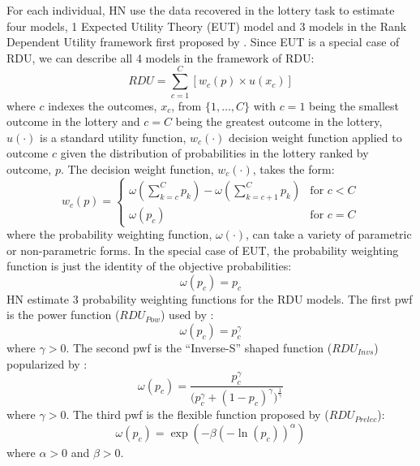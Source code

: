 \documentclass[../main.tex]{subfiles}
\begin{document}
For each individual, HN use the data recovered in the lottery task to estimate four models, 1 Expected Utility Theory (EUT) model and 3 models in the Rank Dependent Utility framework first proposed by \textcite{Quiggin1982}.
Since EUT is a special case of RDU, we can describe all 4 models in the framework of RDU:
\begin{equation}
	\label{eq4:RDU}
	RDU = \sum_{c=1}^{C} \left[ w_c(p) \times u(x_c) \right]
\end{equation}
\noindent where $c$ indexes the outcomes, $x_c$, from $\{1,\ldots,C\}$ with $c=1$ being the smallest outcome in the lottery and $c=C$ being the greatest outcome in the lottery, $u(\cdot)$ is a standard utility function, $w_c(\cdot)$ decision weight function applied to outcome $c$ given the distribution of probabilities in the lottery ranked by outcome, $p$.
The decision weight function, $w_c(\cdot)$, takes the form:
\begin{equation}
	\label{eq4:dweight}
	w_c(p) =
	\begin{cases}
		\omega\left(\displaystyle\sum_{k=c}^C p_k\right) - \omega\left(\displaystyle\sum_{k=c+1}^C p_k\right) & \text{for } c<C \\
		\omega(p_c) & \text{for } c = C
	\end{cases}
\end{equation}
\noindent where the probability weighting function, $\omega(\cdot)$, can take a variety of parametric or non-parametric forms.
In the special case of EUT, the probability weighting function is just the identity of the objective probabilities:
\begin{equation}
	\label{eq4:pw:eut}
	\omega(p_c) = p_c
\end{equation}
\noindent HN estimate 3 probability weighting functions for the RDU models.
The first pwf is the power function ($\mathit{RDU_{Pow}}$) used by \textcite{Quiggin1982}:
\begin{equation}
	\label{eq4:pw:pow}
	\omega(p_c)=p_c^\gamma
\end{equation}
\noindent where $\gamma > 0$. 
The second pwf is the \enquote{Inverse-S} shaped function ($\mathit{RDU_{Invs}}$) popularized by \textcite{Tversky1992}:
\begin{equation}
	\label{eq4:pw:inv}
	\omega(p_c) = \frac{p_c^\gamma}{\biggl(p_c^\gamma + {(1-p_c)}^\gamma\biggr)^{ \frac{1}{\gamma} } }
\end{equation}
\noindent where $\gamma > 0$. 
The third pwf is the flexible function proposed by \textcite{Prelec1998} ($\mathit{RDU_{Prelec}}$):
\begin{equation}
	\label{eq4:pw:pre}
	\omega(p_c)=\exp(-\beta(-\ln(p_c))^\alpha)
\end{equation}
\noindent where $\alpha > 0$ and $\beta > 0$.
\end{document}
